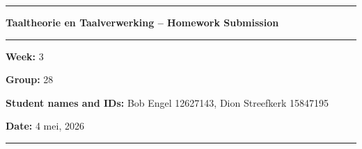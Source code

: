 \documentclass[11pt,a4paper]{article}
\begin{document}

\rule{\textwidth}{1pt}
\begin{center}
  \textbf{Taaltheorie en Taalverwerking -- Homework Submission}
\end{center}
\rule{\textwidth}{0.5pt}


\textbf{Week:} 3

\textbf{Group:} 28

\textbf{Student names and IDs:} Bob Engel 12627143, Dion Streefkerk 15847195

\textbf{Date:} 4 mei, 2026

\rule{\textwidth}{1pt}

\end{document}
